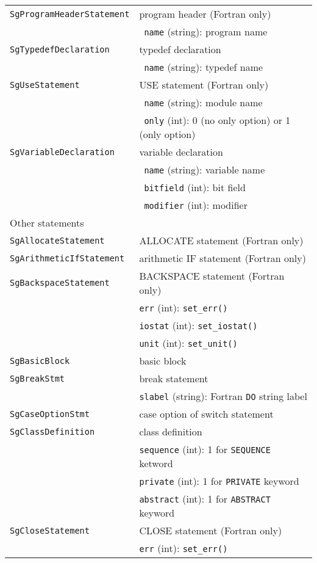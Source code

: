 \begin{longtable}[l]{l|p{10cm}}
 \texttt{SgProgramHeaderStatement}& program header (Fortran only)\\
 & ~\texttt{name} (string): program name\\
 \texttt{SgTypedefDeclaration}& typedef declaration\\
 & ~\texttt{name} (string): typedef name\\
 \texttt{SgUseStatement}& USE statement (Fortran only)\\
 & ~\texttt{name} (string): module name\\
 & ~\texttt{only} (int): 0 (no only option) or 1 (only option)\\
 \texttt{SgVariableDeclaration}& variable declaration \\
 & ~\texttt{name} (string): variable name\\
 & ~\texttt{bitfield} (int): bit field\\
 & ~\texttt{modifier} (int): modifier\\
 \hline
 \multicolumn{2}{l}{Other statements}\\
 \hline
 \texttt{SgAllocateStatement}& ALLOCATE statement (Fortran only)\\
 \texttt{SgArithmeticIfStatement}& arithmetic IF statement (Fortran only)\\
 \texttt{SgBackspaceStatement}& BACKSPACE statement (Fortran only)\\
 & \texttt{err} (int): \texttt{set\_err()}\\
 & \texttt{iostat} (int): \texttt{set\_iostat()}\\
 & \texttt{unit} (int): \texttt{set\_unit()}\\
 \texttt{SgBasicBlock}& basic block\\
 \texttt{SgBreakStmt}& break statement\\
 & \texttt{slabel} (string): Fortran \texttt{DO} string label\\
 \texttt{SgCaseOptionStmt}& case option of switch statement \\
 \texttt{SgClassDefinition}& class definition\\
 & \texttt{sequence} (int): 1 for \texttt{SEQUENCE} ketword\\
 & \texttt{private} (int):  1 for \texttt{PRIVATE} keyword\\
 & \texttt{abstract} (int): 1 for \texttt{ABSTRACT} keyword\\
 \texttt{SgCloseStatement}& CLOSE statement (Fortran only)\\
 & \texttt{err} (int): \texttt{set\_err()}\\

\end{longtable}
